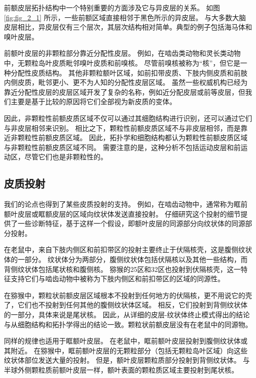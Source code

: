 前额皮层拓扑结构中一个特别重要的方面涉及它与异皮层的关系。
如图 \ref{fig:fig_2_1} 所示，一些前额区域直接相邻于黑色所示的异皮层。
与大多数大脑皮层相比，异皮层仅有三个层次，其层次结构相对简单。典型的例子包括海马体和嗅叶皮层。


前额叶皮层的非颗粒部分靠近分配性皮层。
例如，在啮齿类动物和灵长类动物中，无颗粒岛叶皮质毗邻嗅叶皮质和前嗅核。
尽管前嗅核被称为“核”，但它是一种分配性皮质结构。
其他非颗粒额叶区域，如前扣带皮质、下肢内侧皮质和前肢内侧皮质，毗邻更小、更不为人知的分配性皮层区域。
虽然一些权威机构已经为靠近分配性皮层的皮层区域开发了复杂的名称，例如近分配皮层或前等皮层，但我们主要是基于比较的原因将它们全部视为新皮质的变体。


因此，非颗粒性前额皮质区域不仅可以通过其细胞结构进行识别，还可以通过它们与非皮层相邻来识别。
相比之下，颗粒性前额皮质区域不与非皮层相邻，而是靠近非颗粒性前额皮质区域。
因此，拓扑学和细胞结构都认为颗粒性前额皮质区域与非颗粒性前额皮质区域不同。
需要注意的是，这种分析不包括运动皮层和前运动区，尽管它们也是非颗粒性的。


\subsection{皮质投射}
我们的论点也得到了某些皮质投射的支持。
例如，在啮齿动物中，通常称为眶前额叶皮层或眶额皮层的区域向纹状体发送直接投射。
仔细研究这个投射的细节提供了一些诊断特征，基于这样一个假设，即额叶皮层的同源部分向纹状体的同源部分投射。


在老鼠中，来自下肢内侧区和前扣带区的投射主要终止于伏隔核壳，这是腹侧纹状体的一部分\cite{brog1993patterns,reynolds2005specificity}。
纹状体分为两部分，腹侧纹状体包括伏隔核以及其他一些结构，而背侧纹状体包括尾状核和腹侧核。
猕猴的25区和32区也投射到伏隔核壳\cite{haber1995orbital,haber2006reward}，这一特征支持它们与啮齿动物中被称为下肢内侧区和前扣带区的区域的同源性。


在猕猴中，颗粒状前额皮层区域根本不投射到任何地方的伏隔核，更不用说它的壳了，它们也不投射到任何其他的腹侧纹状体区域。
相反，它们投射到背侧纹状体的一部分，具体来说是尾状核\cite{selemon1985longitudinal}。
因此，从详细的皮层-纹状体终止模式得出的结论与从细胞结构和拓扑学得出的结论一致。颗粒状前额皮层没有在老鼠中的同源物。


同样的规律也适用于眶额叶皮层。
在老鼠中，眶前额叶皮层投射到腹侧纹状体或其附近\cite{berendse1992topographical}。
在猕猴中，眶前额叶皮层的无颗粒部分（包括无颗粒岛叶区域）向这些纹状体部位发送大量的投射。
但是，额叶皮层颗粒质部分投射到背侧纹状体。
与半球外侧颗粒质前额叶皮层一样，额叶表面的颗粒质区域主要投射到尾状核\cite{haber1995orbital,haber2006reward,ferry2000prefrontal,ongur2000organization}。


